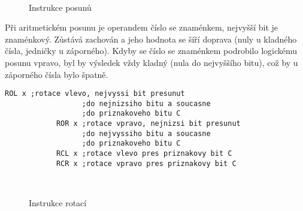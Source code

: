           \begin{figure}[ht!]
            \centering
            \hspace{1em}
                     \\
            \caption{Instrukce posunů}
          \end{figure}
         
          Při aritmetickém posunu je operandem číslo se znaménkem, nejvyšší bit je znaménkový. 
          Zůstává zachován a jeho hodnota se šíří doprava (nuly u kladného čísla, jedničky u 
          záporného). Kdyby se číslo se znaménkem podrobilo logickému posunu vpravo, byl by 
          výsledek vždy kladný (nula do nejvyššího bitu), což by u záporného čísla bylo špatně.

          \begin{lstlisting}[style=luaMITASMStyle]
            ROL x ;rotace vlevo, nejvyssi bit presunut 
                  ;do nejnizsiho bitu a soucasne
                  ;do priznakoveho bitu C
            ROR x ;rotace vpravo, nejnizsi bit presunut 
                  ;do nejvyssiho bitu a soucasne
                  ;do priznakoveho bitu C
            RCL x ;rotace vlevo pres priznakovy bit C
            RCR x ;rotace vpravo pres priznakovy bit C
          \end{lstlisting}
          
          \begin{figure}[ht!]
            \centering
            \hspace{1em}
                     \\
            \hspace{1em}
            \caption{Instrukce rotací}
          \end{figure}
          
